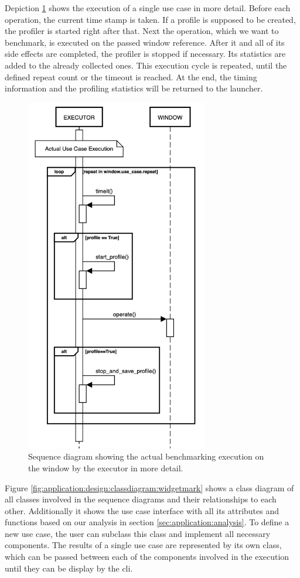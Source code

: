Depiction \ref{fig:application:design:executor} shows the execution of a single
use case in more detail. Before each operation, the current time stamp is taken.
If a profile is supposed to be created, the profiler is started right after
that.  Next the operation, which we want to benchmark, is executed on the passed
window reference. After it and all of its side effects are completed, the
profiler is stopped if necessary. Its statistics are added to the already
collected ones. This execution cycle is repeated, until the defined repeat count
or the timeout is reached. At the end, the timing information and the profiling
statistics will be returned to the launcher.

\begin{figure}[h]
    \centering
    \includegraphics[width=8cm]{resources/img/sequence/executor}
    \caption{
        Sequence diagram showing the actual benchmarking execution on the window
        by the executor in more detail.
    }
    \label{fig:application:design:executor}
\end{figure}

Figure \ref{fig:application:design:classdiagram:widgetmark} shows a class
diagram of all classes involved in the sequence diagrams and their relationships
to each other. Additionally it shows the use case interface with all its
attributes and functions based on our analysis in section
\ref{sec:application:analysis}. To define a new use case, the user can subclass
this class and implement all necessary components. The results of a single use
case are represented by its own class, which can be passed between each of the
components involved in the execution until they can be display by the \gls{cli}.

